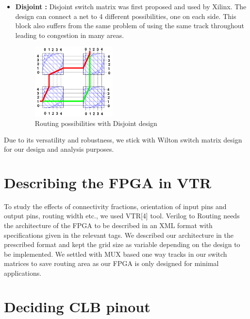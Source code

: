 \begin{itemize}
  \item \textbf{Disjoint : } Disjoint switch matrix was first proposed and used by Xilinx. The design can connect a net to 4 different possibilities, one on each side. This block also suffers from the same problem of using the same track throughout leading to congestion in many areas.
\begin{figure}[H]
\centering
\includegraphics[width=0.4\textwidth]{disjoint_possibility.png}
\caption{Routing possibilities with Disjoint design}
\label{fig:Figure}
\end{figure}
\end{itemize} 

Due to its versatility and robustness, we stick with Wilton switch matrix design for our design and analysis purposes.

\section{Describing the FPGA in VTR}
\paragraph{}
To study the effects of connectivity fractions, orientation of input pins and output pins, routing width etc., we used VTR[4] tool. Verilog to Routing needs the architecture of the FPGA to be described in an XML format with specifications given in the relevant tags. We described our architecture in the prescribed format and kept the grid size as variable depending on the design to be implemented. We settled with MUX based one way tracks in our switch matrices to save routing area as our FPGA is only designed for minimal applications.


\section{Deciding CLB pinout}
\paragraph{}

